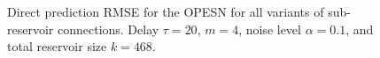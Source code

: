 \begin{figure}[h]
    \centering
    \caption{Direct prediction RMSE for the OPESN for all variants of sub-reservoir connections. Delay $\tau=20$, $m=4$, noise level $\alpha=0.1$, and total reservoir size $k=468$.}
    \label{fig:OPESN_direct_sub_reservoir_connections_m_2}
\end{figure}

